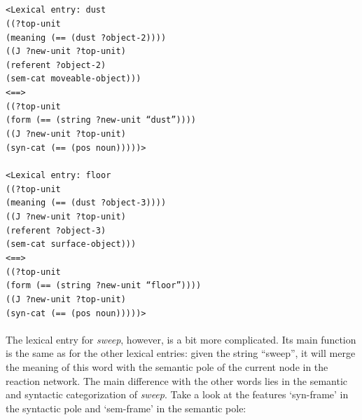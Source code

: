 \\
\\
{\footnotesize{\tt <Lexical entry: dust
\\ ((?top-unit
\\ \hspace*{5mm} (meaning (== (dust ?object-2))))
\\ \hspace*{2mm}((J ?new-unit ?top-unit)
\\ \hspace*{5mm} (referent ?object-2)
\\ \hspace*{5mm} (sem-cat moveable-object)))
\\ <==>
\\ ((?top-unit
\\ \hspace*{5mm} (form (== (string ?new-unit ``dust''))))
\\ \hspace*{2mm}((J ?new-unit ?top-unit)
\\ \hspace*{5mm} (syn-cat (== (pos noun)))))>}
\\
\vspace*{2mm}
\\
{\tt <Lexical entry: floor
\\ ((?top-unit
\\ \hspace*{5mm} (meaning (== (dust ?object-3))))
\\ \hspace*{2mm}((J ?new-unit ?top-unit)
\\ \hspace*{5mm} (referent ?object-3)
\\ \hspace*{5mm} (sem-cat surface-object)))
\\ <==>
\\ ((?top-unit
\\ \hspace*{5mm} (form (== (string ?new-unit ``floor''))))
\\ \hspace*{2mm}((J ?new-unit ?top-unit)
\\ \hspace*{5mm} (syn-cat (== (pos noun)))))>}}\\
\\
The lexical entry for {\em sweep}, however, is a bit more complicated. Its main function is the same as for the other lexical entries: given the string ``sweep'', it will merge the meaning of this word with the semantic pole of the current node in the reaction network. The main difference with the other words lies in the semantic and syntactic categorization of {\em sweep}. Take a look at the features `syn-frame' in the syntactic pole and `sem-frame' in the semantic pole:
